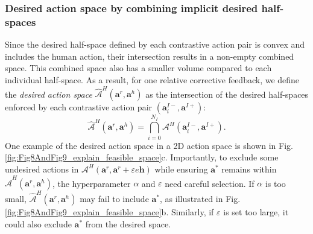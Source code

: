 \subsubsection{Desired action space by combining implicit desired half-spaces}
\label{sec:sub:sub:interpretation_CLIC}
Since the desired half-space defined by each contrastive action pair is convex and includes the human action, their intersection results in a non-empty combined space. This combined space also has a smaller volume compared to each individual half-space. 
As a result, for one relative corrective feedback, we define the \emph{desired action space} $\hat{\mathcal{A}}^H(\bm a^r, \bm a^h)$ as the intersection of the desired half-spaces enforced by each contrastive action pair ${(\bm a^{I-}_i, \bm a^{I+})}$: 
\begin{equation}
\label{eq:def_desired_action_space_From_Halfspaces}
\hat{\mathcal{A}}^H(\bm a^r, \bm a^h) =  \bigcap_{i=0}^{N_I} \mathcal{A}^H{ (\bm a^{I-}_i, \bm a^{I+})}. 
\end{equation}
One example of the desired action space in a 2D action space is shown in Fig. \ref{fig:Fig8AndFig9_explain_feasible_space}c.
Importantly, to exclude some undesired actions in $\mathcal{A}^H { (\bm a^r, \bm a^r + \varepsilon e \bm h)}$ while ensuring $\bm{a}^*$ remains within $\hat{\mathcal{A}}^H(\bm a^r, \bm a^h)$, the hyperparameter $\alpha$ and $\varepsilon$ need careful selection. 
If $\alpha$ is too small, $\hat{\mathcal{A}}^H(\bm a^r, \bm a^h)$ may fail to include $\bm a^*$, as illustrated in
Fig. \ref{fig:Fig8AndFig9_explain_feasible_space}b.
Similarly, if $\varepsilon$ is set too large,  it could also exclude $\bm a^*$ from the desired space. 



